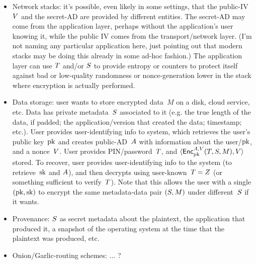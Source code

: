 \begin{itemize}
%
\item Network stacks: it's possible, even likely in some settings, that the public-IV~$V$ and the secret-AD are provided by different entities.  The secret-AD may come from the application layer, perhaps without the application's user knowing it, while the public IV comes from the transport/network layer. (I'm not naming any particular application here, just pointing out that modern stacks may be doing this already in some ad-hoc fashion.)  The application layer can use $T$ and/or $S$ to provide entropy or counters to protect itself against bad or low-quality randomness or nonce-generation lower in the stack where encryption is actually performed.
%
\item Data storage: user wants to store encrypted data~$M$ on a disk, cloud service, etc.  Data has private metadata~$S$ associated to it (e.g. the true length of the data, if padded; the application/version that created the data; timestamp; etc.).  User provides user-identifying info to system, which retrieves the user's public key~$\mathrm{pk}$ and creates public-AD~$A$ with information about the user/$\mathrm{pk}$, and a nonce~$V$.  User provides PIN/password~$T$, and $\langle {\mathsf{Enc}}_{\mathrm{pk}}^{A,V}(T,S,M), V\rangle$ stored.  To recover, user provides user-identifying info to the system (to retrieve~$\mathrm{sk}$ and $A$), and then decrypts using user-known~$T=Z$ (or something sufficient to verify~$T$).  Note that this allows the user with a single $(\mathrm{pk},\mathrm{sk})$ to encrypt the same metadata-data pair $(S,M)$ under different~$S$ if it wants. 
%
\item Provenance: $S$ as secret metadata about the plaintext, the application that produced it, a snapshot of the operating system at the time that the plaintext was produced, etc. 
%
\item Onion/Garlic-routing schemes: ... ? 

\end{itemize}
